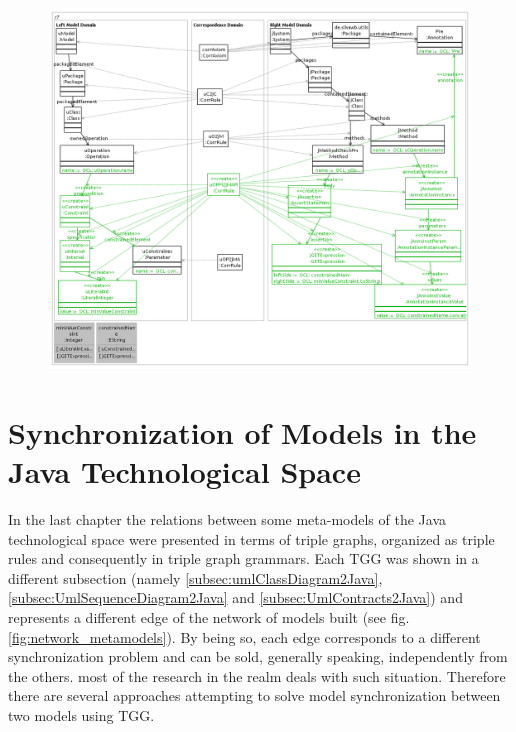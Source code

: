 \documentclass[tuberlin,cic,tc,english,noabntcite]{iiufrgs}
\begin{document}
\begin{figure}[h]
    \caption{}
    \begin{center}
        \includegraphics[width=40em]{uOPPreInt2jMAPreAssert}
    \end{center}
    \label{fig:uOPPreInt2jMAPreAssert}
\end{figure}

\chapter{Synchronization of Models in the Java Technological Space}
\label{chapter:metamodel_synchronization}

In the last chapter the relations between some meta-models of the Java technological space were presented in terms of triple graphs, organized as triple rules and consequently in triple graph grammars. Each TGG was shown in a different subsection (namely \ref{subsec:umlClassDiagram2Java}, \ref{subsec:UmlSequenceDiagram2Java} and \ref{subsec:UmlContracts2Java}) and represents a different edge of the network of models built (see fig. \ref{fig:network_metamodels}). By being so, each edge corresponds to a different synchronization problem and can be sold, generally speaking, independently from the others. most of the research in the realm deals with such situation. Therefore there are several approaches attempting to solve model synchronization between two models using TGG.
\end{document}
